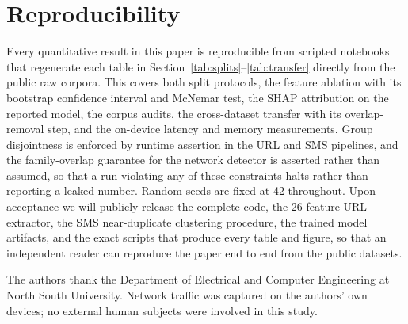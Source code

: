 \documentclass[manuscript,screen,review]{acmart}
\begin{document}
\section{Reproducibility}
Every quantitative result in this paper is reproducible from scripted notebooks that regenerate each table in Section~\ref{tab:splits}--\ref{tab:transfer} directly from the public raw corpora. This covers both split protocols, the feature ablation with its bootstrap confidence interval and McNemar test, the SHAP attribution on the reported model, the corpus audits, the cross-dataset transfer with its overlap-removal step, and the on-device latency and memory measurements. Group disjointness is enforced by runtime assertion in the URL and SMS pipelines, and the family-overlap guarantee for the network detector is asserted rather than assumed, so that a run violating any of these constraints halts rather than reporting a leaked number. Random seeds are fixed at 42 throughout. Upon acceptance we will publicly release the complete code, the 26-feature URL extractor, the SMS near-duplicate clustering procedure, the trained model artifacts, and the exact scripts that produce every table and figure, so that an independent reader can reproduce the paper end to end from the public datasets.

\begin{acks}
The authors thank the Department of Electrical and Computer Engineering at North South University. Network traffic was captured on the authors' own devices; no external human subjects were involved in this study.
\end{acks}
\end{document}

